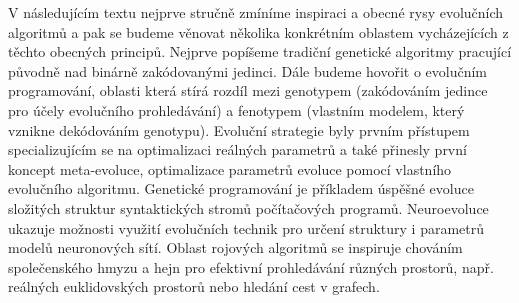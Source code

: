 V následujícím textu nejprve stručně zmíníme inspiraci a obecné rysy evolučních algoritmů a pak se budeme věnovat několika konkrétním oblastem vycházejících z těchto obecných principů. Nejprve popíšeme tradiční genetické algoritmy pracující původně nad binárně zakódovanými jedinci. Dále budeme hovořit o evolučním programování, oblasti která stírá rozdíl mezi genotypem (zakódováním jedince pro účely evolučního prohledávání) a fenotypem (vlastním modelem, který vznikne dekódováním genotypu). Evoluční strategie byly prvním přístupem specializujícím se na optimalizaci reálných parametrů a také přinesly první koncept meta-evoluce, optimalizace parametrů evoluce pomocí vlastního evolučního algoritmu. Genetické programování je příkladem úspěšné evoluce složitých struktur syntaktických stromů počítačových programů. Neuroevoluce ukazuje možnosti využití evolučních technik pro určení struktury i parametrů modelů neuronových sítí. Oblast rojových algoritmů se inspiruje chováním společenského hmyzu a hejn pro efektivní prohledávání různých prostorů, např. reálných euklidovských prostorů nebo hledání cest v grafech. 
